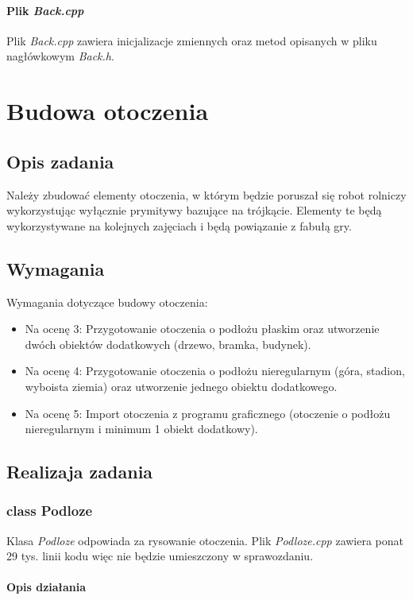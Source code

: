 \documentclass[a4paper, 12pt]{report}
\begin{document}
\subsubsection{Plik \emph{Back.cpp}}
Plik \emph{Back.cpp} zawiera inicjalizacje zmiennych oraz metod opisanych w pliku nagłówkowym \emph{Back.h}.


\chapter{Budowa otoczenia}
\section{Opis zadania}
Należy zbudować elementy otoczenia, w którym będzie poruszał się robot rolniczy wykorzystując wyłącznie prymitywy bazujące na trójkącie. Elementy te będą wykorzystywane na kolejnych zajęciach i będą powiązanie z fabułą gry.
\section{Wymagania}
Wymagania dotyczące budowy otoczenia:
\begin{itemize}
\item Na ocenę 3: Przygotowanie otoczenia o podłożu płaskim oraz utworzenie dwóch obiektów dodatkowych (drzewo, bramka, budynek).
\item Na ocenę 4: Przygotowanie otoczenia o podłożu nieregularnym (góra, stadion, wyboista ziemia) oraz utworzenie jednego obiektu dodatkowego.
\item Na ocenę 5: Import otoczenia z programu graficznego (otoczenie o podłożu nieregularnym i minimum 1 obiekt dodatkowy).
\end{itemize}

\section{Realizaja zadania}

\subsection{class Podloze}

Klasa \emph{Podloze} odpowiada za rysowanie otoczenia. Plik \emph{Podloze.cpp} zawiera ponat 29 tys. linii kodu więc nie będzie umieszczony w sprawozdaniu.

\subsubsection{Opis działania}
\end{document}
